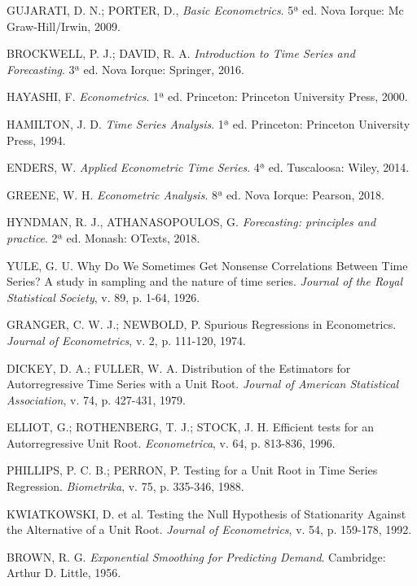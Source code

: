 \documentclass[twocolumn]{rbef}
\newcommand{\1}{\mathbbm{1}}
\begin{document}
\begin{thebibliography}{99}
  

 GUJARATI, D. N.; PORTER, D., \textit{Basic Econometrics}. 5ª ed. Nova Iorque: Mc Graw-Hill/Irwin, 2009.

 BROCKWELL, P. J.; DAVID, R. A. \textit{Introduction to Time Series and Forecasting}. 3ª ed. Nova Iorque: Springer, 2016.

 HAYASHI, F. \textit{Econometrics}. 1ª ed. Princeton: Princeton University Press, 2000.

 HAMILTON, J. D. \textit{Time Series Analysis}. 1ª ed. Princeton: Princeton University Press, 1994.

 ENDERS, W. \textit{Applied Econometric Time Series}. 4ª ed. Tuscaloosa: Wiley, 2014.

 GREENE, W. H. \textit{Econometric Analysis}. 8ª ed. Nova Iorque: Pearson, 2018.

 HYNDMAN, R. J., ATHANASOPOULOS, G. \textit{Forecasting: principles and practice}. 2ª ed. Monash: OTexts, 2018.

 YULE, G. U. Why Do We Sometimes Get Nonsense Correlations Between Time Series? A study in sampling and the nature of time series. \textit{Journal of the Royal Statistical Society}, v. 89, p. 1-64, 1926.

 GRANGER, C. W. J.; NEWBOLD, P. Spurious Regressions in Econometrics. \textit{Journal of Econometrics}, v. 2, p. 111-120, 1974.

 DICKEY, D. A.; FULLER, W. A. Distribution of the Estimators for Autorregressive Time Series with a Unit Root. \textit{Journal of American Statistical Association}, v. 74, p. 427-431, 1979.

 ELLIOT, G.; ROTHENBERG, T. J.; STOCK, J. H. Efficient tests for an Autorregressive Unit Root. \textit{Econometrica}, v. 64, p. 813-836, 1996.

 PHILLIPS, P. C. B.; PERRON, P. Testing for a Unit Root in Time Series Regression. \textit{Biometrika}, v. 75, p. 335-346, 1988.

 KWIATKOWSKI, D. et al. Testing the Null Hypothesis of Stationarity Against the Alternative of a Unit Root. \textit{Journal of Econometrics}, v. 54, p. 159-178, 1992.

 BROWN, R. G. \textit{Exponential Smoothing for Predicting Demand}. Cambridge: Arthur D. Little, 1956.


\end{thebibliography}
\end{document}
